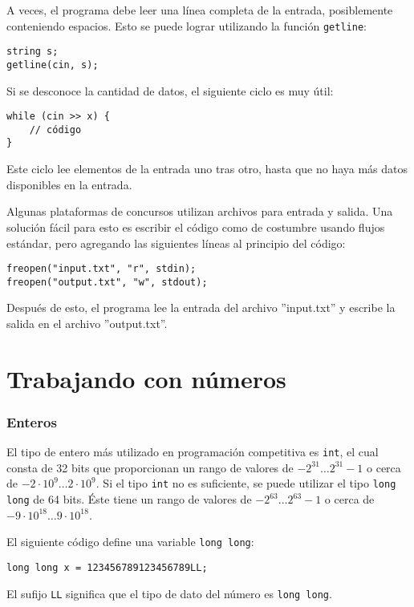 A veces, el programa debe leer una línea completa
de la entrada, posiblemente conteniendo espacios.
Esto se puede lograr utilizando
la función \texttt{getline}:

\begin{lstlisting}
string s;
getline(cin, s);
\end{lstlisting}

Si se desconoce la cantidad de datos, el siguiente
ciclo es muy útil:
\begin{lstlisting}
while (cin >> x) {
    // código
}
\end{lstlisting}
Este ciclo lee elementos de la entrada
uno tras otro, hasta que no haya
más datos disponibles en la entrada.

Algunas plataformas de concursos utilizan archivos para
entrada y salida.
Una solución fácil para esto es escribir
el código como de costumbre usando flujos estándar,
pero agregando las siguientes líneas al principio del código:
\begin{lstlisting}
freopen("input.txt", "r", stdin);
freopen("output.txt", "w", stdout);
\end{lstlisting}
Después de esto, el programa lee la entrada del archivo
''input.txt'' y escribe la salida en el archivo
''output.txt''.

\section{Trabajando con números}


\subsubsection{Enteros}

El tipo de entero más utilizado en programación competitiva
es \texttt{int}, el cual consta de 32 bits que proporcionan
un rango de valores de $-2^{31} \ldots 2^{31}-1$
o cerca de $-2 \cdot 10^9 \ldots 2 \cdot 10^9$.
Si el tipo \texttt{int} no es suficiente,
se puede utilizar el tipo \texttt{long long} de 64 bits.
Éste tiene un rango de valores de $-2^{63} \ldots 2^{63}-1$
o cerca de $-9 \cdot 10^{18} \ldots 9 \cdot 10^{18}$.

El siguiente código define una variable
\texttt{long long}:
\begin{lstlisting}
long long x = 123456789123456789LL;
\end{lstlisting}
El sufijo \texttt{LL} significa que el
tipo de dato del número es \texttt{long long}.

